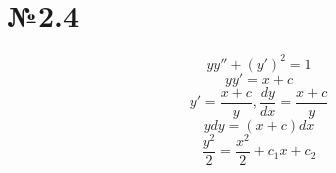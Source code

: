 \documentclass{article}
\begin{document}
\section*{№2.4}
\begin{equation*}
    yy'' + (y')^2 = 1
\end{equation*}
\begin{equation*}
    yy' = x + c
\end{equation*}
\begin{equation*}
    y' = \frac{x + c}{y}, \frac{dy}{dx} = \frac{x + c}{y}
\end{equation*}
\begin{equation*}
    ydy = (x + c) dx
\end{equation*}
\begin{equation*}
    \frac{y^2}{2} = \frac{x^2}{2} + c_1x + c_2
\end{equation*}
\end{document}

